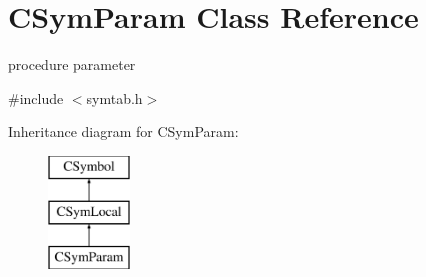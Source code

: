 \hypertarget{classCSymParam}{\section{C\-Sym\-Param Class Reference}
\label{classCSymParam}
}


procedure parameter  




{\ttfamily \#include $<$symtab.\-h$>$}

Inheritance diagram for C\-Sym\-Param\-:\begin{figure}[H]
\begin{center}
\leavevmode
\includegraphics[height=3.000000cm]{classCSymParam}
\end{center}
\end{figure}
